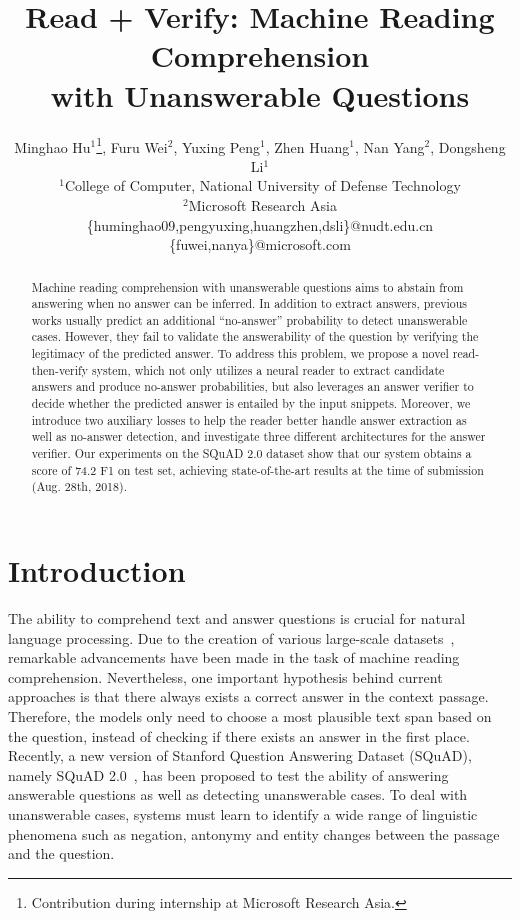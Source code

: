 \documentclass[letterpaper]{article} \usepackage{aaai19}  \usepackage{times}  \usepackage{helvet}  \usepackage{courier}  \usepackage{url}  \usepackage{graphicx}  \usepackage{pbox}
\begin{document}
\title{Read + Verify: Machine Reading Comprehension \\ with Unanswerable Questions}
\author{
Minghao Hu$^1$\thanks{Contribution during internship at Microsoft Research Asia.}, 
Furu Wei$^2$, 
Yuxing Peng$^1$, 
Zhen Huang$^1$, 
Nan Yang$^2$,
Dongsheng Li$^1$
\\ 
$^1$College of Computer, National University of Defense Technology  \\
$^2$Microsoft Research Asia   \\
\{huminghao09,pengyuxing,huangzhen,dsli\}@nudt.edu.cn \\
\{fuwei,nanya\}@microsoft.com
}
\maketitle

\begin{abstract}
Machine reading comprehension with unanswerable questions aims to abstain from answering when no answer can be inferred.
In addition to extract answers, previous works usually predict an additional ``no-answer'' probability to detect unanswerable cases.
However, they fail to validate the answerability of the question by verifying the legitimacy of the predicted answer.
To address this problem, we propose a novel read-then-verify system, which not only utilizes a neural reader to extract candidate answers and produce no-answer probabilities, but also leverages an answer verifier to decide whether the predicted answer is entailed by the input snippets.
Moreover, we introduce two auxiliary losses to help the reader better handle answer extraction as well as no-answer detection, and investigate three different architectures for the answer verifier.
Our experiments on the SQuAD 2.0 dataset show that our system obtains a score of 74.2 F1 on test set, achieving state-of-the-art results at the time of submission (Aug. 28th, 2018).
\end{abstract}
 \section{Introduction}
The ability to comprehend text and answer questions is crucial for natural language processing.
Due to the creation of various large-scale datasets~\cite{Hermann15,Nguyen16,Joshi17,Kovcisky18}, remarkable advancements have been made in the task of machine reading comprehension.
Nevertheless, one important hypothesis behind current approaches is that there always exists a correct answer in the context passage. 
Therefore, the models only need to choose a most plausible text span based on the question, instead of checking if there exists an answer in the first place.  
Recently, a new version of Stanford Question Answering Dataset (SQuAD), namely SQuAD 2.0~\cite{Rajpurkar18}, has been proposed to test the ability of answering answerable questions as well as detecting unanswerable cases.
To deal with unanswerable cases, systems must learn to identify a wide range of linguistic phenomena such as negation, antonymy and entity changes between the passage and the question.
\end{document}
